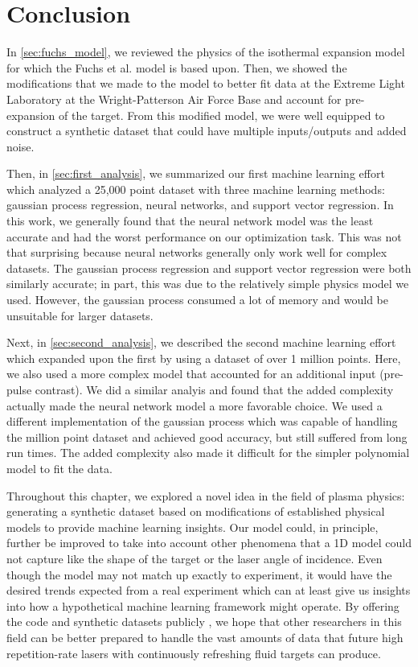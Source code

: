 \section{Conclusion} 

In \autoref{sec:fuchs_model}, we reviewed the physics of the isothermal expansion model for which the Fuchs et al. model is based upon. Then, we showed the modifications that we made to the model to better fit data at the Extreme Light Laboratory at the Wright-Patterson Air Force Base and account for pre-expansion of the target. From this modified model, we were well equipped to construct a synthetic dataset that could have multiple inputs/outputs and added noise.

Then, in \autoref{sec:first_analysis}, we summarized our first machine learning effort which analyzed a 25,000 point dataset with three machine learning methods: gaussian process regression, neural networks, and support vector regression. In this work, we generally found that the neural network model was the least accurate and had the worst performance on our optimization task. This was not that surprising because neural networks generally only work well for complex datasets. The gaussian process regression and support vector regression were both similarly accurate; in part, this was due to the relatively simple physics model we used. However, the gaussian process consumed a lot of memory and would be unsuitable for larger datasets. 

Next, in \autoref{sec:second_analysis}, we described the second machine learning effort which expanded upon the first by using a dataset of over 1 million points. Here, we also used a more complex model that accounted for an additional input (pre-pulse contrast). We did a similar analyis and found that the added complexity actually made the neural network model a more favorable choice. We used a different implementation of the gaussian process which was capable of handling the million point dataset and achieved good accuracy, but still suffered from long run times. The added complexity also made it difficult for the simpler polynomial model to fit the data.

Throughout this chapter, we explored a novel idea in the field of plasma physics: generating a synthetic dataset based on modifications of established physical models to provide machine learning insights. Our model could, in principle, further be improved to take into account other phenomena that a 1D model could not capture like the shape of the target or the laser angle of incidence. Even though the model may not match up exactly to experiment, it would have the desired trends expected from a real experiment which can at least give us insights into how a hypothetical machine learning framework might operate. By offering the code and synthetic datasets publicly \cite{Desai_2024_Zenodo, Desai_2025_Zenodo}, we hope that other researchers in this field can be better prepared to handle the vast amounts of data that future high repetition-rate lasers with continuously refreshing fluid targets can produce.
